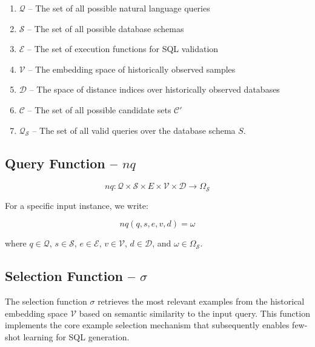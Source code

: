 \begin{enumerate}
    \item $\mathcal{Q}$ – The set of all possible natural language queries
    \item $\mathcal{S}$ – The set of all possible database schemas
    \item $\mathcal{E}$ – The set of execution functions for SQL validation
    \item $\mathcal{V}$ – The embedding space of historically observed samples
    \item $\mathcal{D}$ – The space of distance indices over historically observed databases
    \item $\mathcal{C}$ – The set of all possible candidate sets $\mathcal{C}'$
    \item $\mathcal{Q}_{\mathcal{S}}$ – The set of all valid queries over the database schema $S$.
\end{enumerate}

\subsection{Query Function – $nq$}

\vspace{0.5em}

$$
nq: \mathcal{Q} \times \mathcal{S} \times E \times \mathcal{V} \times \mathcal{D} \rightarrow \Omega_{\mathcal{S}}
$$

\vspace{0.5em}

For a specific input instance, we write:

$$
nq(q, s, e, v, d) = \omega
$$

\vspace{0.5em}

where $q \in \mathcal{Q}$, $s \in \mathcal{S}$, $e \in \mathcal{E}$, $v \in \mathcal{V}$, $d \in \mathcal{D}$, and $\omega \in \Omega_{\mathcal{S}}$.

\subsection{Selection Function – $\sigma$}

The selection function $\sigma$ retrieves the most relevant examples from the
historical embedding space $\mathcal{V}$ based on semantic similarity to the
input query. This function implements the core example selection mechanism 
that subsequently enables few-shot learning for SQL generation.

